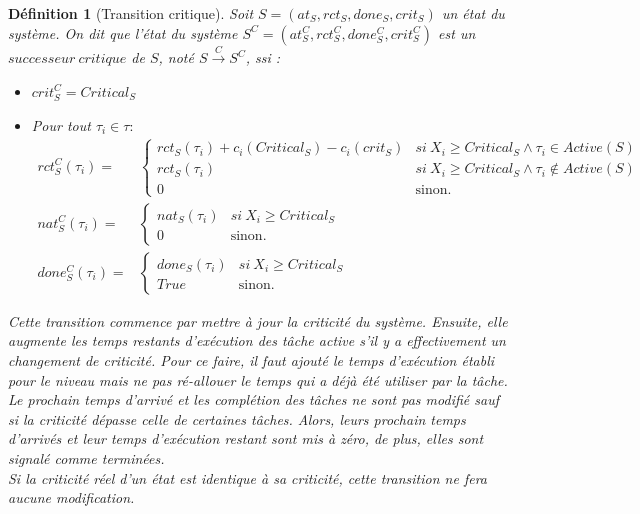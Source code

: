 \documentclass[12pt,a4paper,oneside]{book}
\theoremstyle{break}
\newtheorem{defin}{Définition}[chapter]
\theoremstyle{breakplain}
\begin{document}
\begin{defin}[Transition critique]
\label{spo:tcrit}
Soit $S = (at_S, rct_S, done_S, crit_S)$ un état du système. On dit que l'état du système $S^C = (at_S^C, rct_S^C, done_S^C, crit_S^C)$ est un $successeur\ critique$ de $S$, noté $S\xrightarrow{C}S^C$, ssi :
\begin{itemize}
\item $crit_S^C = Critical_S$
\item Pour tout $\tau_i \in \tau :$
$$
\begin{array}{rl}

rct_S^C(\tau_i) =  &\left\{
    \begin{array}{ll}
        rct_S(\tau_i)+c_i(Critical_S)-c_i(crit_S) & si\ X_i\geq Critical_S \wedge \tau_i \in Active(S)\\
        rct_S(\tau_i) & si\ X_i\geq Critical_S \wedge \tau_i \notin Active(S)\\
        0 & \mbox{sinon.}
    \end{array}
\right.\\

 nat_S^C(\tau_i) = &\left\{
    \begin{array}{ll}
        nat_S(\tau_i) & si\ X_i\geq Critical_S \\
        0 & \mbox{sinon.}
    \end{array}
\right.\\

 done_S^C(\tau_i) = &\left\{
    \begin{array}{ll}
        done_S(\tau_i) & si\ X_i\geq Critical_S \\
        True & \mbox{sinon.}
    \end{array}
\right.

\end{array}
$$
\end{itemize}
Cette transition commence par mettre à jour la criticité du système. Ensuite, elle augmente les temps restants d'exécution des tâche active s'il y a effectivement un changement de criticité. Pour ce faire, il faut ajouté le temps d'exécution établi pour le niveau mais ne pas ré-allouer le temps qui a déjà été utiliser par la tâche.\\
Le prochain temps d'arrivé et les complétion des tâches ne sont pas modifié sauf si la criticité dépasse celle de certaines tâches. Alors, leurs prochain temps d'arrivés et leur temps d'exécution restant sont mis à zéro, de plus, elles sont signalé comme terminées.\\ 
Si la criticité réel d'un état est identique à sa criticité, cette transition ne fera aucune modification.
\end{defin}
\end{document}
